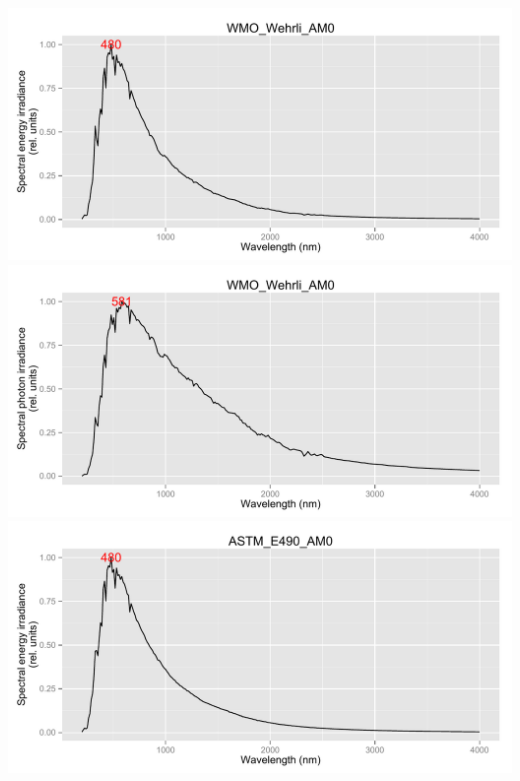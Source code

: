 \documentclass{article}\usepackage{knitr}
\begin{document}
\begin{knitrout}\footnotesize
{}\color{fgcolor}\begin{kframe}
\begin{alltt}
 \hlkwb{<-} \hlstd{(}\hlstd{,} \hlstd{,} \hlstd{)}
   
  \hlstd{(} \hlstd{=}\hlstd{,} \hlstd{=}\hlstd{)}
\hlstd{\}}
\end{alltt}
\end{kframe}

{\centering \includegraphics[width=.95\textwidth]{figure/pos-extraterrestrial1} 
\includegraphics[width=.95\textwidth]{figure/pos-extraterrestrial2} 
\includegraphics[width=.95\textwidth]{figure/pos-extraterrestrial3} 
}
\end{knitrout}
\end{document}
